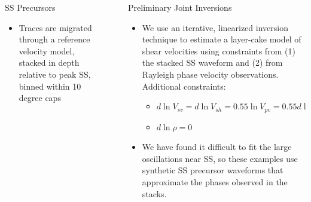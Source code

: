 \documentclass[final]{beamer}
\newlength{\sepwid}
\newlength{\onecolwid}
\newlength{\twocolwid}
\begin{document}
\begin{frame}[t]
\begin{columns}[t]
\begin{column}{\twocolwid}
\begin{columns}[t,totalwidth=\twocolwid]
\begin{column}{\onecolwid}
\begin{block}{SS Precursors}
\begin{itemize}

\item Traces are migrated through a reference velocity model, stacked in depth relative to peak SS, binned within 10 degree caps

\end{itemize}


\end{block}


\end{column} %

\end{columns} %

\end{column} %

\begin{column}{\sepwid}\end{column} %

\begin{column}{\onecolwid} %


\begin{block}{Preliminary Joint Inversions}

\begin{itemize}

\item We use an iterative, linearized inversion technique to estimate a layer-cake model of shear velocities using constraints from (1) the stacked SS waveform and (2) from Rayleigh phase velocity observations.  Additional constraints:

	\begin{itemize}

	\item $d \ln V_{sv} = d \ln V_{sh} = 0.55 \ln V_{pv} = 0.55 d \ln V_{ph}$
	\item $d \ln \rho = 0$

	\end{itemize}

\item We have found it difficult to fit the large oscillations near SS, so these examples use synthetic SS precursor waveforms that approximate the phases observed in the stacks.


\end{itemize}
\end{block}
\end{column}
\end{columns}
\end{frame}
\end{document}
